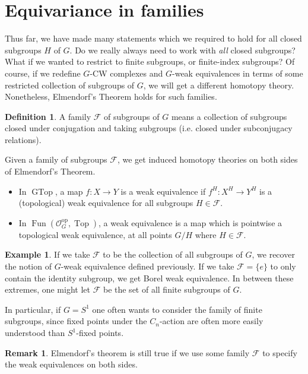 \documentclass{amsart}
\theoremstyle{definition}
\newtheorem{defn}[thm]{Definition}
\newtheorem{example}[thm]{Example}
\newtheorem{remark}[thm]{Remark}
\numberwithin{thm}{section}
\def\O{\mathscr{O}}
\def\F{\mathscr{F}}
\def\op{\operatorname{op}}
\def\GTop{\operatorname{GTop}}
\def\Top{\operatorname{Top}}
\def\Fun{\operatorname{Fun}}
\begin{document}
\section{Equivariance in families}

Thus far, we have made many statements which we required to hold for all closed subgroups $H$ of $G$. Do we really always need to work with \emph{all} closed subgroups? What if we wanted to restrict to finite subgroups, or finite-index subgroups? Of course, if we redefine $G$-CW complexes and $G$-weak equivalences in terms of some restricted collection of subgroups of $G$, we will get a different homotopy theory. Nonetheless, Elmendorf's Theorem holds for such families.

\begin{defn} A family $\F$ of subgroups of $G$ means a collection of subgroups closed under conjugation and taking subgroups (i.e. closed under subconjugacy relations).
\end{defn}

Given a family of subgroups $\F$, we get induced homotopy theories on both sides of Elmendorf's Theorem.
\begin{itemize}
    \item In $\GTop$, a map $f: X \to Y$ is a weak equivalence if $f^H: X^H \to Y^H$ is a (topological) weak equivalence for all subgroups $H \in \F$. 
    \item In $\Fun(\O_G^{\op}, \Top)$, a weak equivalence is a map which is pointwise a topological weak equivalence, at all points $G/H$ where $H \in \F$. 
\end{itemize}

\begin{example}
    If we take $\F$ to be the collection of all subgroups of $G$, we recover the notion of $G$-weak equivalence defined previously. If we take $\F = \{e\}$ to only contain the identity subgroup, we get Borel weak equivalence. In between these extremes, one might let $\F$ be the set of all finite subgroups of $G$.
\end{example}

In particular, if $G = S^1$ one often wants to consider the family of finite subgroups, since fixed points under the $C_n$-action are often more easily understood than $S^1$-fixed points. 

\begin{remark}
    Elmendorf's theorem is still true if we use some family $\F$ to specify the weak equivalences on both sides. 
\end{remark}
\end{document}
